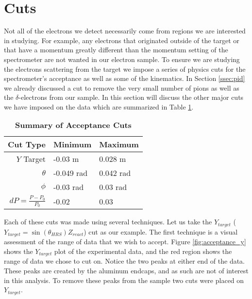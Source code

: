 
\section{Cuts}
\label{sec:cuts}

Not all of the electrons we detect necessarily come from regions we are interested in studying. For example, any electrons that originated outside of the target or that have a momentum greatly different than the momentum setting of the spectrometer are not wanted in our electron sample. To ensure we are studying the electrons scattering from the target we impose a series of physics cuts for the spectrometer's acceptance as well as some of the kinematics. In Section \ref{ssec:pid} we already discussed a cut to remove the very small number of pions as well as the $\delta$-electrons from our sample. In this section will discuss the other major cuts we have imposed on the data which are summarized in Table \ref{tab:cuts}. 

\vspace{5mm}

\begin{table}[!h]
\centering
\begin{tabular}{|r | l l|}
\hline
\textbf{Cut Type} & \textbf{Minimum} & \textbf{Maximum}\\
\hline
$Y$ Target & -0.03 m & 0.028 m\\ 
$\theta$ & -0.049 rad & 0.042 rad\\ 
$\phi$ & -0.03 rad & 0.03 rad\\ 
$dP = \frac{P-P_0}{P_0}$ & -0.02 & 0.03\\ 
\hline
\end{tabular}
\caption[Summary of Acceptance Cuts]{{\bf{Summary of Acceptance Cuts}} }
\label{tab:cuts}
\end{table}

Each of these cuts was made using several techniques. Let us take the $Y_{target}$ ($Y_{target}=\sin\left(\theta_{HRS}\right)Z_{react}$) cut as our example. The first technique is a visual assessment of the range of data that we wish to accept. Figure \ref{fig:acceptance_y} shows the $Y_{target}$ plot of the experimental data, and the red region shows the range of data we chose to cut on. Notice the two peaks at either end of the data. These peaks are created by the aluminum endcaps, and as such are not of interest in this analysis. To remove these peaks from the sample two cuts were placed on $Y_{target}$. 

